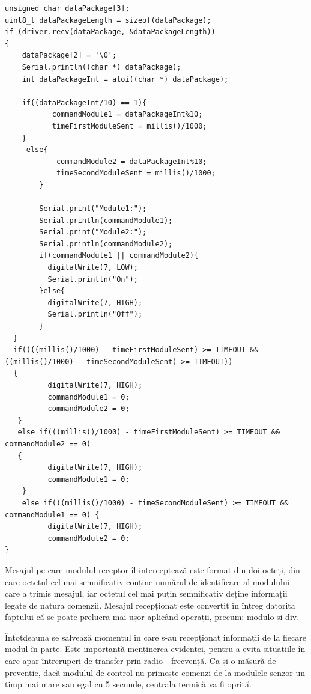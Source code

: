 \vspace{1em}
	
\begin{lstlisting}
unsigned char dataPackage[3];
uint8_t dataPackageLength = sizeof(dataPackage);
if (driver.recv(dataPackage, &dataPackageLength))
{
    dataPackage[2] = '\0';
    Serial.println((char *) dataPackage);
    int dataPackageInt = atoi((char *) dataPackage);

    if((dataPackageInt/10) == 1){
           commandModule1 = dataPackageInt%10;
           timeFirstModuleSent = millis()/1000;
    }
     else{
            commandModule2 = dataPackageInt%10;
            timeSecondModuleSent = millis()/1000;
        }
        
        Serial.print("Module1:");
        Serial.println(commandModule1);
        Serial.print("Module2:");
        Serial.println(commandModule2);
        if(commandModule1 || commandModule2){
          digitalWrite(7, LOW);
          Serial.println("On");
        }else{
          digitalWrite(7, HIGH);
          Serial.println("Off");
        }
  }
  if((((millis()/1000) - timeFirstModuleSent) >= TIMEOUT && ((millis()/1000) - timeSecondModuleSent) >= TIMEOUT))
  {
          digitalWrite(7, HIGH);
          commandModule1 = 0;
          commandModule2 = 0;
   }
   else if(((millis()/1000) - timeFirstModuleSent) >= TIMEOUT && commandModule2 == 0)
   {
          digitalWrite(7, HIGH);
          commandModule1 = 0;
    }
    else if(((millis()/1000) - timeSecondModuleSent) >= TIMEOUT && commandModule1 == 0) {
          digitalWrite(7, HIGH);
          commandModule2 = 0;
}
\end{lstlisting}
\vspace{2em} 

	Mesajul pe care modulul receptor îl interceptează este format din doi octeți, din care octetul cel mai semnificativ conține numărul de identificare al modulului care a trimis mesajul, iar octetul cel mai puțin semnificativ deține informații legate de natura comenzii. Mesajul recepționat este convertit în întreg datorită faptului că se poate prelucra mai ușor aplicând operații, precum: modulo și div.

	Întotdeauna se salvează momentul în care s-au recepționat informații de la fiecare modul în parte. Este importantă menținerea evidenței, pentru a evita situațiile în care apar întreruperi de transfer prin radio - frecvență. Ca și o măsură de prevenție, dacă modulul de control nu primește comenzi de la modulele senzor un timp mai mare sau egal cu 5 secunde, centrala termică va fi oprită.

